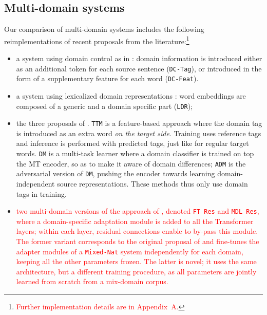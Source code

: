\documentclass[11pt,a4paper]{article}
\newcommand{\fyDone}[1]{\done[FY]\Todo[FY:]{\textcolor{orange}{#1}}}
\newcommand{\revision}[1]{\textcolor{red}{#1}}
\newcommand{\system}[1]{\texttt{{#1}}}
\begin{document}
\subsection{Multi-domain systems \label{ssec:systems}}
\fyDone{Remove Gated residual}
Our comparison of multi-domain systems includes the following reimplementations of recent proposals from the literature:\footnote{\revision{Further implementation details are in Appendix~A.}}
\begin{itemize}
\item a system using domain control as in \cite{Kobus17domaincontrol}: domain information is introduced either as an additional token for each source sentence (\system{DC-Tag}), or introduced in the form of a supplementary feature for each word (\system{DC-Feat}).
\item a system using lexicalized domain representations \cite{Pham19generic}: word embeddings are composed of a generic and a domain specific part (\system{LDR});\fyDone{why not LDR as in Minh's paper?}
\item the three proposals of . \system{TTM} is a feature-based approach where the domain tag is introduced as an extra word \textsl{on the target side}. Training uses reference tags and inference is performed with predicted tags, just like for regular target words. \system{DM} is a multi-task learner where a domain classifier is trained on top the MT encoder, so as to make it aware of domain differences; \system{ADM} is the adversarial version of \system{DM}, pushing the encoder towards learning domain-independent source representations. These methods thus only use domain tags in training.
\item \revision{two multi-domain versions of the approach of \newcite{Bapna19simple}, denoted \system{FT Res} and \system{MDL Res}, where a domain-specific adaptation module is added to all the Transformer layers; within each layer, residual connections enable to by-pass this module. The former variant corresponds to the original proposal of \citet{Bapna19simple} and fine-tunes the adapter modules of a \system{Mixed-Nat} system independently for each domain, keeping all the other parameters frozen. The latter is novel; it uses the same architecture, but a different training procedure, as all parameters are jointly learned from scratch from a mix-domain corpus. }

\end{itemize}
\end{document}
